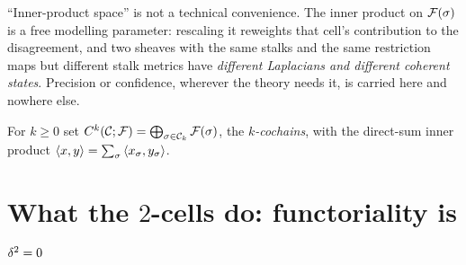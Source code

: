 \begin{remark}
\label{rem:metricmeaning}
``Inner-product space'' is not a technical convenience. The inner product on
$\mathcal{F}(\sigma)$ is a free modelling parameter: rescaling it reweights that
cell's contribution to the disagreement, and two sheaves with the same stalks
and the same restriction maps but different stalk metrics have
\emph{different Laplacians and different coherent states}. Precision or
confidence, wherever the theory needs it, is carried here and nowhere else.
\end{remark}

\begin{definition}[Cochains]\label{def:cochains}
For $k\ge0$ set $C^{k}(\mathcal{C};\mathcal{F})=\bigoplus_{\sigma\in\mathcal{C}_k}\mathcal{F}(\sigma)$, the
\emph{$k$-cochains}, with the direct-sum inner product
$\left\langle x,y\right\rangle=\sum_\sigma\left\langle x_\sigma,y_\sigma\right\rangle$.
\end{definition}

\section{What the $2$-cells do: functoriality is $\delta^2=0$}


